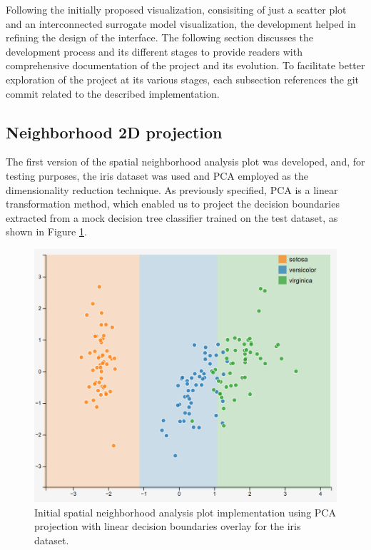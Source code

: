 

Following the initially proposed visualization, consisiting of just a scatter plot and an interconnected surrogate model visualization, the development helped in refining the design of the interface.  
The following section discusses the development process and its different stages to provide readers with comprehensive documentation of the project and its evolution. To facilitate better exploration of the project at its various stages, each subsection references the git commit related to the described implementation.


\subsection{Neighborhood 2D projection}

The first version of the spatial neighborhood analysis plot \cite{git3commit} was developed, and, for testing purposes, the iris dataset was used and PCA employed as the dimensionality reduction technique. As previously specified, PCA is a linear transformation method, which enabled us to project the decision boundaries extracted from a mock decision tree classifier trained on the test dataset, as shown in Figure \ref{fig:firstScatterPlot}.

\begin{figure}
    \centering
    \includegraphics[width=0.7\linewidth]{images/first scatter plot.png}
    \caption{Initial spatial neighborhood analysis plot implementation using PCA projection with linear decision boundaries overlay for the iris dataset.}
    \label{fig:firstScatterPlot}
\end{figure}

